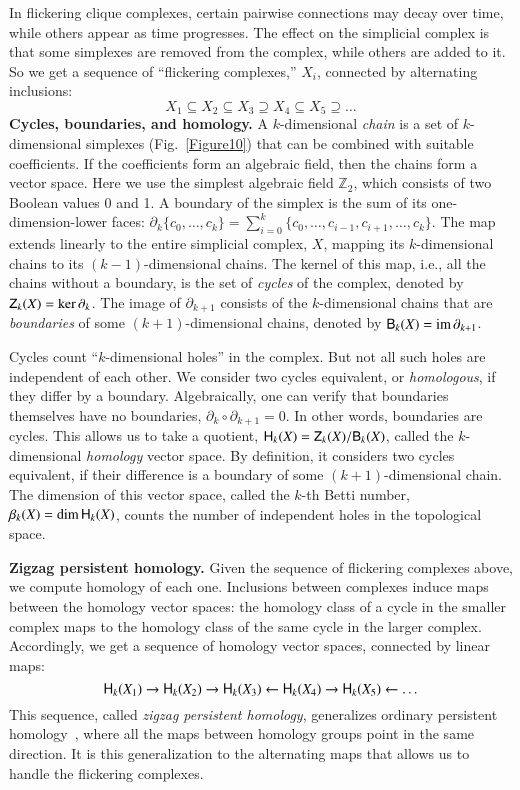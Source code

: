 \documentclass[12pt,tightenlines]{revtex4}
\newcommand{\bdry}{\partial}
\newcommand{\Zgr}{{\sf Z}}
\newcommand{\Bgr}{{\sf B}}
\newcommand{\Hgr}{{\sf H}}
\newcommand{\im}{\operatorname{im}}
\newcommand{\Betti}{\beta}
\newcommand{\ot}{\leftarrow}
\begin{document}
In flickering clique complexes, certain pairwise connections may decay over time, while others appear as time progresses. 
The effect on the simplicial complex is that some simplexes are removed from the complex, while others are added to it. 
So we get a sequence of ``flickering complexes,'' $X_i$, connected by alternating inclusions:
\[
X_1 \subseteq X_2 \subseteq X_3 \supseteq X_4 \subseteq X_5 \supseteq \ldots
\]
\textbf{Cycles, boundaries, and homology.}
A $k$-dimensional \emph{chain} is a set of $k$-dimensional simplexes (Fig.~\ref{Figure10}) that can be combined with 
suitable coefficients. If the coefficients form an algebraic field, then the chains form a vector space. Here we use the 
simplest algebraic field $\mathbb{Z}_2$, which consists of two Boolean values 0 and 1.  A boundary of the simplex is 
the sum of its one-dimension-lower faces:
$\bdry_k \{ c_0, \ldots, c_k \} = \sum_{i=0}^k \{ c_0, \ldots, c_{i-1}, c_{i+1}, \ldots, c_k \}$.
The map extends linearly to the entire simplicial complex, $X$, mapping its $k$-dimensional chains to its $(k-1)$-dimensional 
chains. The kernel of this map, i.e., all the chains without a boundary, is the set of \emph{cycles} of the complex, denoted by 
$\Zgr_k(X) = \ker \bdry_k$. The image of $\bdry_{k+1}$ consists of the $k$-dimensional chains that are \emph{boundaries} 
of some $(k+1)$-dimensional chains, denoted by $\Bgr_k(X) = \im \bdry_{k+1}$.

Cycles count ``$k$-dimensional holes'' in the complex. But not all such holes are independent of each other. We consider 
two cycles equivalent, or \emph{homologous}, if they differ by a boundary. Algebraically, one can verify that boundaries 
themselves have no boundaries, $\bdry_k \circ \bdry_{k+1} = 0$. In other words, boundaries are cycles.
This allows us to take a quotient, $\Hgr_k(X) = \Zgr_k(X) / \Bgr_k(X)$, called the $k$-dimensional \emph{homology} vector 
space. By definition, it considers two cycles equivalent, if their difference is a boundary of some $(k+1)$-dimensional chain. 
The dimension of this vector space, called the $k$-th Betti number, $\Betti_k(X) = \dim \Hgr_k(X)$, counts the number of 
independent holes in the topological space.

\textbf{Zigzag persistent homology.}
Given the sequence of flickering complexes above, we compute homology of each one. Inclusions between complexes induce 
maps between the homology vector spaces: the homology class of a cycle in the smaller complex maps to the homology class 
of the same cycle in the larger complex. Accordingly, we get a sequence of homology vector spaces, connected by linear maps:
\[
\Hgr_k(X_1) \to \Hgr_k(X_2) \to \Hgr_k(X_3) \ot \Hgr_k(X_4) \to \Hgr_k(X_5) \ot \ldots
\]
This sequence, called \emph{zigzag persistent homology}, generalizes ordinary persistent homology~\cite{Edelsbrunner}, where all 
the maps between homology groups point in the same direction. It is this generalization to the alternating maps that allows us 
to handle the flickering complexes.
\end{document}
